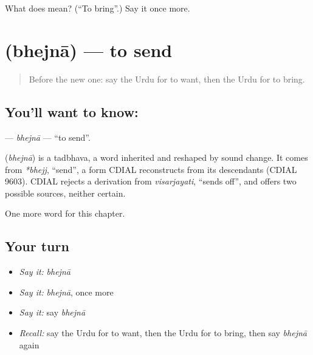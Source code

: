 \begin{tcolorbox}[breakable,colback=teal!4,colframe=teal!35!black,title={Before you move on}]
What does  mean? (\textquotedblleft{}To bring\textquotedblright{}.) Say it once more.
\end{tcolorbox}
\section[\texorpdfstring{\ur{بھیجنا} (bhejnā)}{بھیجنا (bhejnā)}]{ (bhejnā) — to send}

\label{lesson:UR-C51-bhejna}



\begin{quote}
Before the new one: say the Urdu for to want, then the Urdu for to bring.
\end{quote}

\subsection*{You'll want to know: }
\textbf{} — \emph{bhejnā} — \textquotedblleft{}to send\textquotedblright{}.

\begin{cousinweb}
\textbf{} (\emph{bhejnā}) is a tadbhava, a word inherited and reshaped by sound change. It comes from \emph{*bhejj}, \textquotedblleft{}send\textquotedblright{}, a form CDIAL reconstructs from its descendants (CDIAL 9603). CDIAL rejects a derivation from \emph{visarjayati}, \textquotedblleft{}sends off\textquotedblright{}, and offers two possible sources, neither certain.
\end{cousinweb}

\begin{grammarlens}[title={What you've built}]
One more word for this chapter.
\end{grammarlens}

\subsection*{Your turn}
\begin{itemize}
\raggedright
  \item \emph{Say it:} \emph{bhejnā}
  \item \emph{Say it:} \emph{bhejnā}, once more
  \item \emph{Say it:} say \emph{bhejnā}
  \item \emph{Recall:} say the Urdu for to want, then the Urdu for to bring, then say \emph{bhejnā} again
\end{itemize}

